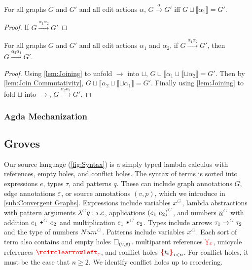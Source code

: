 \begin{lemma}
  \label{lem:Join Commutativity}
\end{lemma}

\begin{lemma}[Joining]
  \label{lem:Joining}
  For all graphs $G$ and $G'$ and all edit actions $\alpha$,
  $G \overset{\alpha}{\longrightarrow} G'$
  iff $G \sqcup \llbracket\alpha_1\rrbracket = G'$.
\end{lemma}
\begin{proof}
  If $G \overset{\alpha_1\alpha_2}{\longrightarrow} G'$
\end{proof}


\begin{theorem}[Commutativity]
  \label{thm:Commutativity}
  For all graphs $G$ and $G'$ and all edit actions $\alpha_1$ and $\alpha_2$,
  if $G \overset{\alpha_1\alpha_2}{\longrightarrow} G'$,
  then $G \overset{\alpha_2\alpha_1}{\longrightarrow} G'$.
\end{theorem}
\begin{proof}
  Using \autoref{lem:Joining} to unfold $\rightarrow$ into $\sqcup$,
  $G \sqcup \llbracket\alpha_1 \sqcup \llbracket \sqcup \alpha_2 \rrbracket = G'$.
  Then by \autoref{lem:Join Commutativity},
  $G \sqcup \llbracket\alpha_2 \sqcup \llbracket \sqcup \alpha_1 \rrbracket = G'$.
  Finally using \autoref{lem:Joining} to fold $\sqcup$ into $\rightarrow$,
  $G \overset{\alpha_2\alpha_1}{\longrightarrow} G'$.
\end{proof}

\subsubsection{Agda Mechanization}%
\label{sub:Agda Mechanization}

\subsection{Groves}%
\label{sub:Groves}

\figureTermSyntax


Our source language (\autoref{fig:Syntax}) is a simply typed lambda calculus with references, empty holes, and conflict holes.
The syntax of terms is sorted into
  expressions $e$,
  types $\tau$,
  and patterns $q$.
These can include
  graph annotations $G$,
  edge annotations $\varepsilon$,
  or source annotations $(v, p)$,
  which we introduce in \autoref{sub:Convergent Graphs}.
Expressions include
  variables $\eVar{G}{x}$,
  lambda abstractions with pattern arguments $\eFun{G}{q}{\tau}{e}$,
  applications $\eApp{G}{e_1}{e_2}$,
  and numbers $\eNum{G}{n}$ with addition $\ePlus{G}{e_1}{e_2}$ and multiplication $\eTimes{G}{e_1}{e_2}$.
Types include
  arrows $\tArrow{G}{\tau_1}{\tau_2}$
  and the type of numbers $\tNum{G}$.
Patterns include variables $\pVar{G}{x}$.
Each sort of term also contains
and empty holes $\square_{(v, p)}$.
multiparent references $\textcolor{red}{\curlyveedownarrow_{\varepsilon}}$,
unicycle references $\cycleVertex{\e}$,
and conflict holes $\conflictHole{t_i}_{i < n}$.
For conflict holes, it must be the case that $n \geq 2$.
We identify conflict holes up to reordering.

